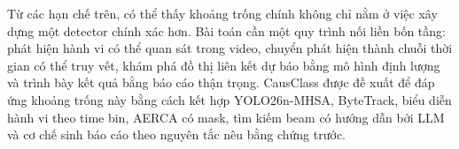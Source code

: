 Từ các hạn chế trên, có thể thấy khoảng trống chính không chỉ nằm ở việc xây dựng một detector chính xác hơn. Bài toán cần một quy trình nối liền bốn tầng: phát hiện hành vi có thể quan sát trong video, chuyển phát hiện thành chuỗi thời gian có thể truy vết, khám phá đồ thị liên kết dự báo bằng mô hình định lượng và trình bày kết quả bằng báo cáo thận trọng. CausClass được đề xuất để đáp ứng khoảng trống này bằng cách kết hợp YOLO26n-MHSA, ByteTrack, biểu diễn hành vi theo time bin, AERCA có mask, tìm kiếm beam có hướng dẫn bởi LLM và cơ chế sinh báo cáo theo nguyên tắc nêu bằng chứng trước.
